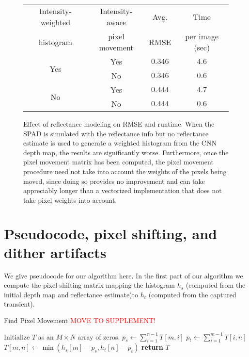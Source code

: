 \documentclass[runningheads]{llncs}
\newcommand{\edit}[1]{\textcolor{red}{#1}}
\begin{document}
\begin{figure}[H]
  \centering
  \begin{tabular}{c|c|c|c}
    \toprule
    Intensity-weighted & Intensity-aware & Avg. & Time \\ histogram & pixel movement & RMSE & per image (sec) \\
    \midrule
    \multirow{2}{*}{Yes} & Yes & $0.346$ & $4.6$ \\
                         & No & $0.346$ & $0.6$ \\
    \midrule
    \multirow{2}{*}{No} & Yes & $0.444$ & $4.7$ \\
                        & No & $0.444$ & $0.6$ \\
    \bottomrule
  \end{tabular}
  \caption{Effect of reflectance modeling on RMSE and runtime. When the SPAD
    is simulated with the reflectance info but no reflectance estimate is used
    to generate a weighted histogram from the CNN depth map, the results are
    significantly worse. Furthermore, once the pixel movement matrix has been
    computed, the pixel movement procedure need not take
    into account the weights of the pixels being moved, since doing so provides no
    improvement and can take appreciably longer than a vectorized implementation
    that does not take pixel weights into account.}
\end{figure}

\section{Pseudocode, pixel shifting, and dither artifacts}
We give pseudocode for our algorithm here. In the first part of our algorithm we
compute the pixel shifting matrix mapping the histogram $h_s$ (computed from the
initial depth map and reflectance estimate)to $h_t$ (computed from the captured
transient).
{ \footnotesize
\begin{algorithm}
 \caption{Find Pixel Movement \edit{MOVE TO SUPPLEMENT!}} 
 \label{alg:ehm}
 \begin{algorithmic}
	\footnotesize
    \State Initialize $T$ as an $M \times N$ array of zeros.
        \State $p_s \gets \sum_{i=1}^{n-1} T[m, i]$
        \State $p_t \gets \sum_{i=1}^{m-1} T[i, n]$
        \State $T[m, n] \gets \min(h_s[m] - p_s, h_t[n] - p_t)$
      \EndFor
    \EndFor
    \State \textbf{return} $T$
  \EndProcedure
 \end{algorithmic}
\end{algorithm}
}
\end{document}
